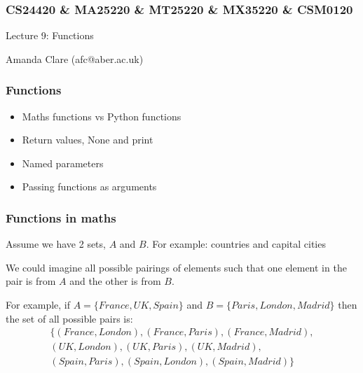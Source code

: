 \documentclass{beamer}
\begin{document}

\begin{frame}
\frametitle{CS24420 \& MA25220 \& MT25220 \& MX35220 \& CSM0120}

\begin{center}
\begin{huge}
Lecture 9: Functions
\end{huge}
\bigskip

Amanda Clare (afc@aber.ac.uk)

\end{center}
\end{frame}



\begin{frame}[fragile]
\frametitle{Functions}
\begin{itemize}
\item Maths functions vs Python functions
\item Return values, None and print
\item Named parameters
\item Passing functions as arguments
\end{itemize}
\end{frame}


\begin{frame}[fragile]
\frametitle{Functions in maths}
Assume we have 2 sets, $A$ and $B$. For example: countries and capital cities
\bigskip

We could imagine all possible pairings of elements such that one
element in the pair is from $A$ and the other is from $B$. 
\bigskip

For example, if
$A = \{France, UK, Spain\}$ and $B = \{Paris, London, Madrid\}$ then
the set of all possible pairs is:
\begin{multline*}
\{ (France, London), (France, Paris), (France, Madrid), \\
(UK, London),
  (UK, Paris), (UK, Madrid), \\
(Spain, Paris), (Spain, London), (Spain,
  Madrid) \}
 \end{multline*}
\end{frame}
\end{document}
